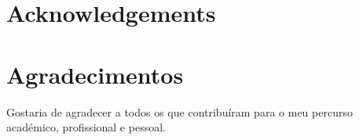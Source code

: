 \thispagestyle{plain}

{\section*{Acknowledgements}}
{\section*{Agradecimentos}}


Gostaria de agradecer a todos os que contribuíram para o meu percurso académico, profissional e pessoal. 


